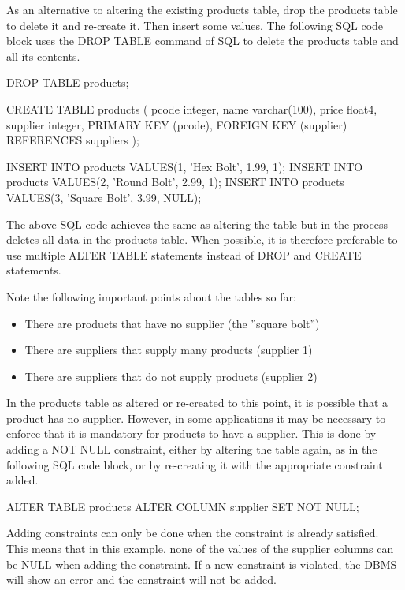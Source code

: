 As an alternative to altering the existing products table, drop the products table to delete it and re-create it. Then insert some values. The following SQL code block uses the DROP TABLE command of SQL to delete the products table and all its contents.

\begin{samepage}
\begin{sqlcode}
DROP TABLE products;

CREATE TABLE products (
  pcode    integer,
  name     varchar(100),
  price    float4,
  supplier integer,
  PRIMARY KEY (pcode),
  FOREIGN KEY (supplier) REFERENCES suppliers 
);
  
INSERT INTO products VALUES(1, 'Hex Bolt', 1.99, 1);
INSERT INTO products VALUES(2, 'Round Bolt', 2.99, 1);
INSERT INTO products VALUES(3, 'Square Bolt', 3.99, NULL);
\end{sqlcode}
\end{samepage}

The above SQL code achieves the same as altering the table but in the process deletes all data in the products table. When possible, it is therefore preferable to use multiple ALTER TABLE statements instead of DROP and CREATE statements. 

Note the following important points about the tables so far:
\begin{itemize}
  \item There are products that have no supplier (the ''square bolt'')
  \item There are suppliers that supply many products (supplier 1)
  \item There are suppliers that do not supply products (supplier 2)
\end{itemize}

In the products table as altered or re-created to this point, it is possible that a product has no supplier. However, in some applications it may be necessary to enforce that it is mandatory for products to have a supplier. This is done by adding a NOT NULL constraint, either by altering the table again, as in the following SQL code block, or by re-creating it with the appropriate constraint added.

\begin{sqlcode}
ALTER TABLE products ALTER COLUMN supplier SET NOT NULL;
\end{sqlcode}

Adding constraints can only be done when the constraint is already satisfied. This means that in this example, none of the values of the supplier columns can be NULL when adding the constraint. If a new constraint is violated, the DBMS will show an error and the constraint will not be added.

